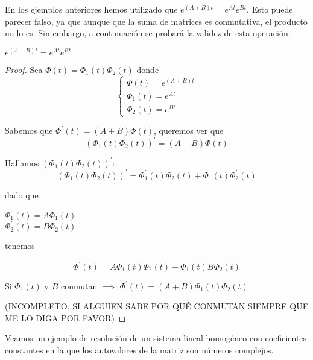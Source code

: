 En los ejemplos anteriores hemos utilizado que $e^{(A+B)t} = e^{At}e^{Bt}$. Esto puede parecer falso, ya que aunque que la suma de matrices es conmutativa, el producto no lo es. Sin embargo, a continuación se probará la validez de esta operación:

\begin{theorem}
$e^{(A+B)t} = e^{At}e^{Bt}$
\end{theorem}
\begin{proof}
Sea $\Phi(t) = \Phi_1(t)\Phi_2(t)$ donde 
\begin{equation*}
  \left\lbrace
  \begin{array}{l}
  	\Phi(t) = e^{(A+B)t}\\
	\Phi_1(t) = e^{At}\\
	\Phi_2(t) = e^{Bt}
  \end{array}
  \right.
\end{equation*}

Sabemos que $\Phi^\prime(t) = (A+B)\Phi(t)$, queremos ver que $$(\Phi_1(t)\Phi_2(t))^\prime = (A+B)\Phi(t)$$

Hallamos $(\Phi_1(t)\Phi_2(t))^\prime$:
$$(\Phi_1(t)\Phi_2(t))^\prime = \Phi^\prime_1(t)\Phi_2(t)+\Phi_1(t)\Phi^\prime_2(t)$$

dado que \begin{center}
$\Phi^\prime_1(t) = A\Phi_1(t)$\\
$\Phi^\prime_2(t) = B\Phi_2(t)$
\end{center}

tenemos

$$\Phi^\prime(t) = A\Phi_1(t)\Phi_2(t)+\Phi_1(t)B\Phi_2(t)$$

Si $\Phi_1(t)$ y $B$ conmutan $\implies$ $\Phi^\prime(t) = (A+B)\Phi_1(t)\Phi_2(t)$

(INCOMPLETO, SI ALGUIEN SABE POR QUÉ CONMUTAN SIEMPRE QUE ME LO DIGA POR FAVOR)
\end{proof}

Veamos un ejemplo de resolución de un sistema lineal homogéneo con coeficientes constantes en la que los autovalores de la matriz son números complejos.

